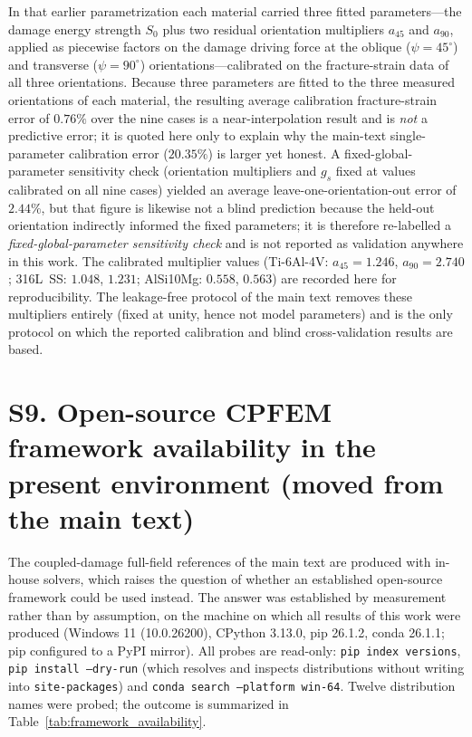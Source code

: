 \documentclass[12pt,a4paper,twocolumn]{article}
\begin{document}
In that earlier parametrization each material carried three fitted parameters---the damage energy strength $S_0$ plus two residual orientation multipliers $a_{45}$ and $a_{90}$, applied as piecewise factors on the damage driving force at the oblique ($\psi=45^\circ$) and transverse ($\psi=90^\circ$) orientations---calibrated on the fracture-strain data of all three orientations. Because three parameters are fitted to the three measured orientations of each material, the resulting average calibration fracture-strain error of $0.76\%$ over the nine cases is a near-interpolation result and is \emph{not} a predictive error; it is quoted here only to explain why the main-text single-parameter calibration error ($20.35\%$) is larger yet honest. A fixed-global-parameter sensitivity check (orientation multipliers and $g_s$ fixed at values calibrated on all nine cases) yielded an average leave-one-orientation-out error of $2.44\%$, but that figure is likewise not a blind prediction because the held-out orientation indirectly informed the fixed parameters; it is therefore re-labelled a \emph{fixed-global-parameter sensitivity check} and is not reported as validation anywhere in this work. The calibrated multiplier values (Ti-6Al-4V: $a_{45}=1.246$, $a_{90}=2.740$; 316L~SS: $1.048$, $1.231$; AlSi10Mg: $0.558$, $0.563$) are recorded here for reproducibility. The leakage-free protocol of the main text removes these multipliers entirely (fixed at unity, hence not model parameters) and is the only protocol on which the reported calibration and blind cross-validation results are based.

\section*{S9. Open-source CPFEM framework availability in the present environment (moved from the main text)}

The coupled-damage full-field references of the main text are produced with in-house solvers, which
raises the question of whether an established open-source framework could be used instead. The answer
was established by measurement rather than by assumption, on the machine on which all results of this
work were produced (Windows 11 (10.0.26200), CPython 3.13.0, pip 26.1.2, conda 26.1.1; pip configured
to a PyPI mirror). All probes are read-only: \texttt{pip index versions}, \texttt{pip install --dry-run}
(which resolves and inspects distributions without writing into \texttt{site-packages}) and
\texttt{conda search --platform win-64}. Twelve distribution names were probed; the outcome is
summarized in Table~\ref{tab:framework_availability}.
\end{document}
